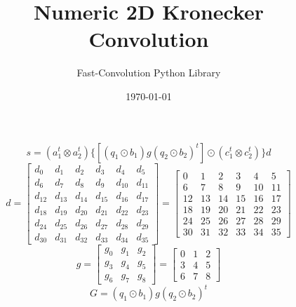 \documentclass{article}%
\title{Numeric 2D Kronecker Convolution}%
\author{Fast{-}Convolution Python Library}%
\date{\today}%
\begin{document}
%
\normalsize%
\maketitle%
\[%
s=(a_1^t \otimes a_2^t) \{[(q_1 \odot b_1) g (q_2 \odot b_2)^t] \odot (c_1^t \otimes c_2^t)\} d%
\]%
\[%
d = \left[\begin{matrix}d_{0} & d_{1} & d_{2} & d_{3} & d_{4} & d_{5}\\d_{6} & d_{7} & d_{8} & d_{9} & d_{10} & d_{11}\\d_{12} & d_{13} & d_{14} & d_{15} & d_{16} & d_{17}\\d_{18} & d_{19} & d_{20} & d_{21} & d_{22} & d_{23}\\d_{24} & d_{25} & d_{26} & d_{27} & d_{28} & d_{29}\\d_{30} & d_{31} & d_{32} & d_{33} & d_{34} & d_{35}\end{matrix}\right] = \left[\begin{matrix}0 & 1 & 2 & 3 & 4 & 5\\6 & 7 & 8 & 9 & 10 & 11\\12 & 13 & 14 & 15 & 16 & 17\\18 & 19 & 20 & 21 & 22 & 23\\24 & 25 & 26 & 27 & 28 & 29\\30 & 31 & 32 & 33 & 34 & 35\end{matrix}\right]%
\]%
\[%
g = \left[\begin{matrix}g_{0} & g_{1} & g_{2}\\g_{3} & g_{4} & g_{5}\\g_{6} & g_{7} & g_{8}\end{matrix}\right] = \left[\begin{matrix}0 & 1 & 2\\3 & 4 & 5\\6 & 7 & 8\end{matrix}\right]%
\]%
\[%
G = (q_1 \odot b_1) g (q_2 \odot b_2)^t%
\]%
\end{document}
